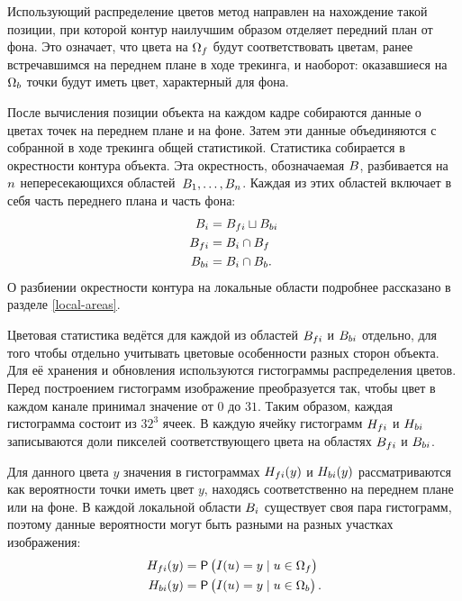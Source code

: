 
Использующий распределение цветов метод направлен на нахождение такой
позиции, при которой контур наилучшим образом отделяет передний план от фона.
Это означает, что цвета на $\Omega_f$ будут соответствовать цветам,
ранее встречавшимся на переднем плане в ходе трекинга, и наоборот:
оказавшиеся на $\Omega_b$ точки будут иметь цвет, характерный для фона.

После вычисления позиции объекта на каждом кадре собираются данные о цветах
точек на переднем плане и на фоне.
Затем эти данные объединяются с собранной в ходе трекинга общей статистикой.
Статистика собирается в окрестности контура объекта.
Эта окрестность, обозначаемая $B$, разбивается на $n$
непересекающихся областей~$B_1, \dots, B_{n}$.
Каждая из этих областей включает в себя часть переднего плана и часть фона:
\begin{align}\label{eqn:histo_partitioning}
    B_{i} &= {B_{fi}} \sqcup {\ensuremath{B_{bi}}} \\
    {B_{fi}} &= B_{i} \cap B_{f} \\
    {B_{bi}} &= B_{i} \cap B_{b}
\text{.}
\end{align}
О разбиении окрестности контура на локальные области подробнее рассказано в
разделе \ref{local-areas}.

Цветовая статистика ведётся для каждой из областей ${B_{fi}}$ и
${B_{bi}}$ отдельно, для того чтобы отдельно учитывать цветовые
особенности разных сторон объекта.
Для её хранения и обновления используются гистограммы распределения цветов.
Перед построением гистограмм изображение преобразуется так, чтобы цвет в каждом
канале принимал значение от $0$ до $31$.
Таким образом, каждая гистограмма состоит из $32^3$ ячеек.
В каждую ячейку гистограмм ${H_{fi}}$ и $H_{bi}{}$
записываются доли пикселей соответствующего цвета на областях $B_{fi}$
и $B_{bi}$.

Для данного цвета $y$ значения в гистограммах $H_{fi}(y)$ и
$H_{bi}(y)$ рассматриваются как вероятности точки иметь цвет $y$,
находясь соответственно на переднем плане или на фоне.
В каждой локальной области $B_{i}$ существует своя пара гистограмм, поэтому
данные вероятности могут быть разными на разных участках изображения:
\begin{align}\label{eqn:H_f_Y}
    H_{fi}(y) &= \mathsf{P} \left( I(\mathnormal{u}) = y \mid \mathnormal{u} \in \Omega_f \right) \\
    H_{bi}(y) &= \mathsf{P} \left( I(\mathnormal{u}) = y \mid \mathnormal{u} \in \Omega_b \right)
\text{.}
\end{align}


